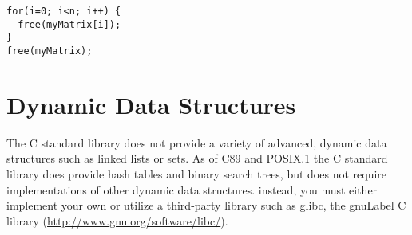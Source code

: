 \begin{verbatim}
for(i=0; i<n; i++) {
  free(myMatrix[i]);
}
free(myMatrix);
\end{verbatim}

\section{Dynamic Data Structures}

The C standard library does not provide a variety of advanced, dynamic
data structures such as linked lists or sets.  As of C89 and POSIX.1 the
C standard library does provide hash tables and binary search trees, but
does not require implementations of other dynamic data structures.
instead, you must either implement your own or utilize a third-party 
library such as glibc, the \gls{gnuLabel} C library 
(\url{http://www.gnu.org/software/libc/}).





